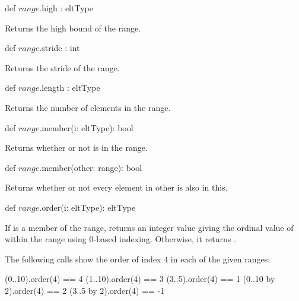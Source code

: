 \begin{protohead}
def $range$.high : eltType
\end{protohead}
\begin{protobody}
Returns the high bound of the range.
\end{protobody}

\begin{protohead}
def $range$.stride : int
\end{protohead}
\begin{protobody}
Returns the stride of the range.
\end{protobody}

\begin{protohead}
def $range$.length : eltType
\end{protohead}
\begin{protobody}
Returns the number of elements in the range.
\end{protobody}

\begin{protohead}
def $range$.member(i: eltType): bool
\end{protohead}
\begin{protobody}
Returns whether or not  is in the range.
\end{protobody}

\begin{protohead}
def $range$.member(other: range): bool
\end{protohead}
\begin{protobody}
Returns whether or not every element in other is also in this.
\end{protobody}

\begin{protohead}
def $range$.order(i: eltType): eltType
\end{protohead}
\begin{protobody}
If  is a member of the range, returns an integer value giving
the ordinal value of  within the range using 0-based indexing.
Otherwise, it returns .
\end{protobody}

\begin{example}
The following calls show the order of index 4 in each of the given
ranges:
\begin{chapel}
(0..10).order(4) == 4
(1..10).order(4) == 3
(3..5).order(4) == 1
(0..10 by 2).order(4) == 2
(3..5 by 2).order(4) == -1
\end{chapel}
\end{example}
